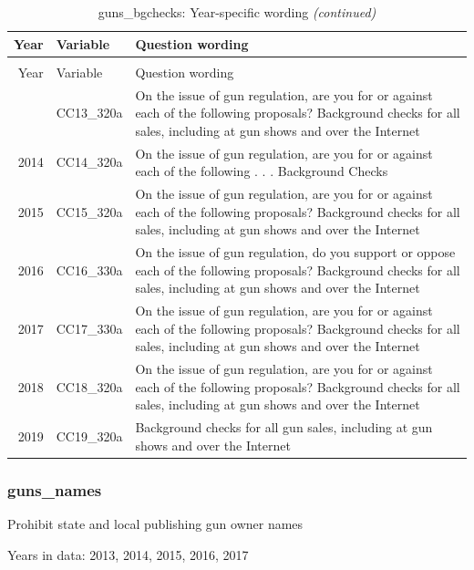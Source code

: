 \documentclass[12pt]{article}
\begin{document}
\begin{longtable}[t]{rl>{\raggedright\arraybackslash}p{10cm}}
\caption{\label{tab:unnamed-chunk-4}guns\_bgchecks: Year-specific wording}\\
\toprule
Year & Variable & Question wording\\
\midrule
\endfirsthead
\caption[]{guns\_bgchecks: Year-specific wording \textit{(continued)}}\\
\toprule
Year & Variable & Question wording\\
\midrule
\endhead
\
\endfoot
\bottomrule
\endlastfoot
2013 & CC13\_320a & On the issue of gun regulation, are you for or against each of the following proposals? Background checks for all sales, including at gun shows and over the Internet\\
2014 & CC14\_320a & On the issue of gun regulation, are you for or against each of the following . . . Background Checks\\
2015 & CC15\_320a & On the issue of gun regulation, are you for or against each of the following proposals? Background checks for all sales, including at gun shows and over the Internet\\
2016 & CC16\_330a & On the issue of gun regulation, do you support or oppose each of the following proposals? Background checks for all sales, including at gun shows and over the Internet\\
2017 & CC17\_330a & On the issue of gun regulation, are you for or against each of the following proposals? Background checks for all sales, including at gun shows and over the Internet\\
2018 & CC18\_320a & On the issue of gun regulation, are you for or against each of the following proposals? Background checks for all sales, including at gun shows and over the Internet\\
2019 & CC19\_320a & Background checks for all gun sales, including at gun shows and over the Internet\\*
\end{longtable}

\subsubsection{guns\_names}\label{guns_names}

Prohibit state and local publishing gun owner names

Years in data: 2013, 2014, 2015, 2016,
2017\begingroup\fontsize{10}{12}\selectfont
\end{document}
